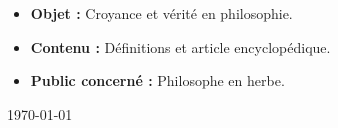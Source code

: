 \begin{titlepage}
\vfill
{\sf \footnotesize
\begin{itemize}[leftmargin=1cm, label=, itemsep=1pt]
\item {\bf Objet : } Croyance et vérité en philosophie.
\item {\bf Contenu : } Définitions et article encyclopédique.
\item {\bf Public concerné : } Philosophe en herbe.
\end{itemize}
}

\vfill

{\large \today}

\end{titlepage}

